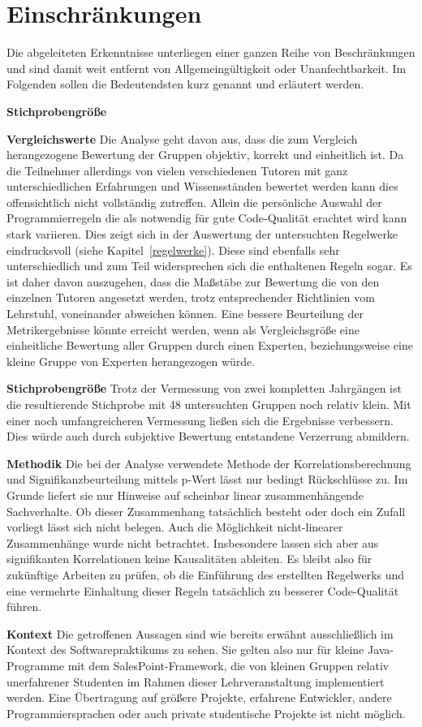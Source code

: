 \documentclass[da,ngerman]{stthesis}
\begin{document}
  		\section{Einschränkungen}
  			Die abgeleiteten Erkenntnisse unterliegen einer ganzen Reihe von Beschränkungen und sind damit weit entfernt von Allgemeingültigkeit oder Unanfechtbarkeit. Im Folgenden sollen die Bedeutendsten kurz genannt und erläutert werden.
  			\begin{labeling}{\textbf{Stichprobengröße}}
				\item [\textbf{Vergleichswerte}] Die Analyse geht davon aus, dass die zum Vergleich herangezogene Bewertung der Gruppen objektiv, korrekt und einheitlich ist. Da die Teilnehmer allerdings von vielen verschiedenen Tutoren mit ganz unterschiedlichen Erfahrungen und Wissensständen bewertet werden kann dies offensichtlich nicht vollständig zutreffen. Allein die persönliche Auswahl der Programmierregeln die als notwendig für gute Code-Qualität erachtet wird kann stark variieren. Dies zeigt sich in der Auswertung der untersuchten Regelwerke eindrucksvoll (siehe Kapitel~\ref{regelwerke}). Diese sind ebenfalls sehr unterschiedlich und zum Teil widersprechen sich die enthaltenen Regeln sogar. Es ist daher davon auszugehen, dass die Maßstäbe zur Bewertung die von den einzelnen Tutoren angesetzt werden, trotz entsprechender Richtlinien vom Lehrstuhl, voneinander abweichen können. Eine bessere Beurteilung der Metrikergebnisse könnte erreicht werden, wenn als Vergleichsgröße eine einheitliche Bewertung aller Gruppen durch einen Experten, beziehungsweise eine kleine Gruppe von Experten herangezogen würde.
				\item [\textbf{Stichprobengröße}] Trotz der Vermessung von zwei kompletten Jahrgängen ist die resultierende Stichprobe mit 48 untersuchten Gruppen noch relativ klein. Mit einer noch umfangreicheren Vermessung ließen sich die Ergebnisse verbessern. Dies würde auch durch subjektive Bewertung entstandene Verzerrung abmildern.
				\item [\textbf{Methodik}] Die bei der Analyse verwendete Methode der Korrelationsberechnung und Signifikanzbeurteilung mittels p-Wert lässt nur bedingt Rückschlüsse zu. Im Grunde liefert sie nur Hinweise auf scheinbar linear zusammenhängende Sachverhalte. Ob dieser Zusammenhang tatsächlich besteht oder doch ein Zufall vorliegt lässt sich nicht belegen. Auch die Möglichkeit nicht-linearer Zusammenhänge wurde nicht betrachtet. Insbesondere lassen sich aber aus signifikanten Korrelationen keine Kausalitäten ableiten. Es bleibt also für zukünftige Arbeiten zu prüfen, ob die Einführung des erstellten Regelwerks und eine vermehrte Einhaltung dieser Regeln tatsächlich zu besserer Code-Qualität führen.
				\item [\textbf{Kontext}] Die getroffenen Aussagen sind wie bereits erwähnt ausschließlich im Kontext des Softwarepraktikums zu sehen. Sie gelten also nur für kleine Java-Programme mit dem SalesPoint-Framework, die von kleinen Gruppen relativ unerfahrener Studenten im Rahmen dieser Lehrveranstaltung implementiert werden. Eine Übertragung auf größere Projekte, erfahrene Entwickler, andere Programmiersprachen oder auch private studentische Projekte ist nicht möglich.
			\end{labeling}
\end{document}

